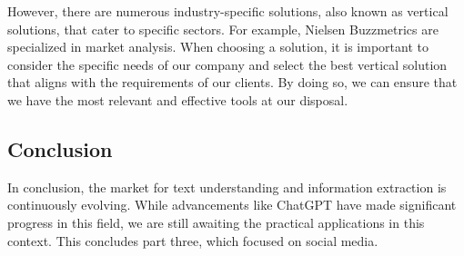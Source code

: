 However, there are numerous industry-specific solutions, also known as
vertical solutions, that cater to specific sectors. For example, Nielsen Buzzmetrics are specialized in market analysis. When choosing a solution, it is important to
consider the specific needs of our company and select the best vertical
solution that aligns with the requirements of our clients. By doing so,
we can ensure that we have the most relevant and effective tools at our
disposal.

\subsection{Conclusion}\label{conclusion}

In conclusion, the market for text understanding and information
extraction is continuously evolving. While advancements like ChatGPT
have made significant progress in this field, we are still awaiting the
practical applications in this context. This concludes part three, which
focused on social media.


